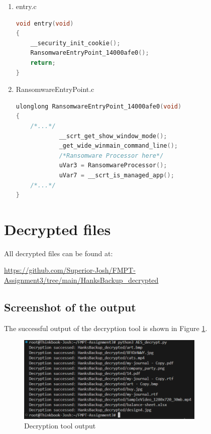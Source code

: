\documentclass[11pt]{article}
\begin{document}
\begin{enumerate}
    \item entry.c \begin{lstlisting}[language=C++, caption=entry.c]
void entry(void)
{
    __security_init_cookie();
    RansomwareEntryPoint_14000afe0();
    return;
}
\end{lstlisting}

    \item RansomwareEntryPoint.c \begin{lstlisting}[language=C++, caption=RansomwareEntryPoint\_14000afe0.c]
ulonglong RansomwareEntryPoint_14000afe0(void)
{
    /*...*/
            __scrt_get_show_window_mode();
            _get_wide_winmain_command_line();
            /*Ransomware Processor here*/
            uVar3 = RansomwareProcessor();
            uVar7 = __scrt_is_managed_app();
    /*...*/
}
\end{lstlisting}

\end{enumerate}

\newpage
\section{Decrypted files}
All decrypted files can be found at:

\url{https://github.com/Superior-Josh/FMPT-Assignment3/tree/main/HanksBackup_decrypted}

\subsection{Screenshot of the output}
The successful output of the decryption tool is shown in Figure \ref{fig:output}.
\begin{figure}[htbp]
    \centering
    \includegraphics[width=0.8\textwidth]{img/output.png}
    \caption{Decryption tool output}
    \label{fig:output}
\end{figure}
\end{document}
